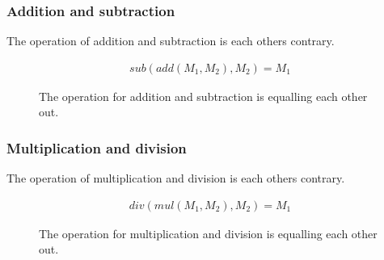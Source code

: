 \subsubsection{Addition and subtraction}
The operation of addition and subtraction is each others contrary.
\begin{figure}[h]
    \begin{center}
        \begin{align*}
            sub(add(M_1,M_2), M_2) = M_1
        \end{align*}
    \end{center}
    \caption{The operation for addition and subtraction is equalling each other out.}
\end{figure}

\FloatBarrier

\subsubsection{Multiplication and division}
The operation of multiplication and division is each others contrary.
\begin{figure}[h]
    \begin{center}
        \begin{align*}
            div(mul(M_1, M_2), M_2) = M_1
        \end{align*}
    \end{center}
    \caption{The operation for multiplication and division is equalling each other out.}
\end{figure}
\FloatBarrier
